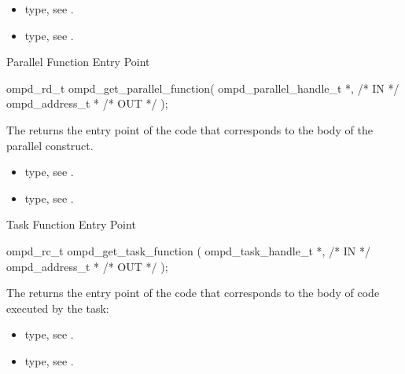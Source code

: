 \argdesc

\crossreferences
\begin{itemize}
	\item {} type, see .
	\item {} type, see .
\end{itemize}


\summary
Parallel Function Entry Point
\format
\cspecificstart
\begin{boxedcode}
ompd\_rd\_t ompd\_get\_parallel\_function(
  ompd\_parallel\_handle\_t *,                         /* IN */
  ompd\_address\_t *                             /* OUT */
);
\end{boxedcode}
\cspecificend

\descr
The  returns the
entry point of the code that corresponds to the body of
the parallel construct.
\argdesc

\crossreferences
\begin{itemize}
	\item {} type, see .
	\item {} type, see .
\end{itemize}


\summary
Task Function Entry Point
\format
\cspecificstart
\begin{boxedcode}
ompd\_rc\_t ompd\_get\_task\_function (
  ompd\_task\_handle\_t *,                                 /* IN */
  ompd\_address\_t *                                 /* OUT */
);
\end{boxedcode}
\cspecificend

\descr
The  returns the entry point of the code
that corresponds to the body of code executed by the task:

\argdesc

\crossreferences
\begin{itemize}
	\item {} type, see .
	\item {} type, see .
\end{itemize}


